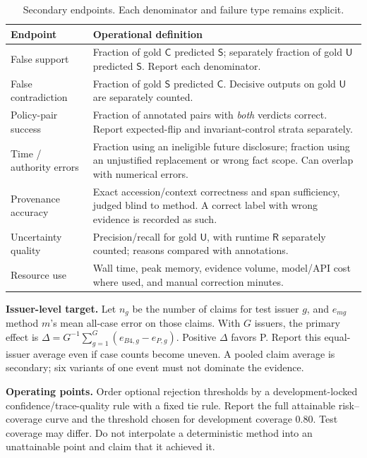 \documentclass[11pt,a4paper]{article}
\newcommand{\lead}[1]{\textbf{\color{navy}#1}}
\newcommand{\Slabel}{\mathsf{S}}
\newcommand{\Clabel}{\mathsf{C}}
\newcommand{\Ulabel}{\mathsf{U}}
\newcommand{\Rlabel}{\mathsf{R}}
\begin{document}
\begin{table}[H]\caption{Secondary endpoints. Each denominator and failure type remains explicit.}
\small\begin{tabularx}{\linewidth}{p{.28\linewidth}Y}\toprule
Endpoint & Operational definition\\\midrule
False support & Fraction of gold $\Clabel$ predicted $\Slabel$; separately fraction of gold $\Ulabel$ predicted $\Slabel$. Report each denominator.\\
False contradiction & Fraction of gold $\Slabel$ predicted $\Clabel$. Decisive outputs on gold $\Ulabel$ are separately counted.\\
Policy-pair success & Fraction of annotated pairs with \emph{both} verdicts correct. Report expected-flip and invariant-control strata separately.\\
Time / authority errors & Fraction using an ineligible future disclosure; fraction using an unjustified replacement or wrong fact scope. Can overlap with numerical errors.\\
Provenance accuracy & Exact accession/context correctness and span sufficiency, judged blind to method. A correct label with wrong evidence is recorded as such.\\
Uncertainty quality & Precision/recall for gold $\Ulabel$, with runtime $\Rlabel$ separately counted; reasons compared with annotations.\\
Resource use & Wall time, peak memory, evidence volume, model/API cost where used, and manual correction minutes.\\\bottomrule
\end{tabularx}\end{table}

\lead{Issuer-level target.} Let $n_g$ be the number of claims for test issuer $g$, and $e_{mg}$ method $m$'s mean all-case error on those claims. With $G$ issuers, the primary effect is $\Delta=G^{-1}\sum_{g=1}^G(e_{B4,g}-e_{P,g})$. Positive $\Delta$ favors P. Report this equal-issuer average even if case counts become uneven. A pooled claim average is secondary; six variants of one event must not dominate the evidence.

\lead{Operating points.} Order optional rejection thresholds by a development-locked confidence/trace-quality rule with a fixed tie rule. Report the full attainable risk--coverage curve and the threshold chosen for development coverage 0.80. Test coverage may differ. Do not interpolate a deterministic method into an unattainable point and claim that it achieved it.
\end{document}
